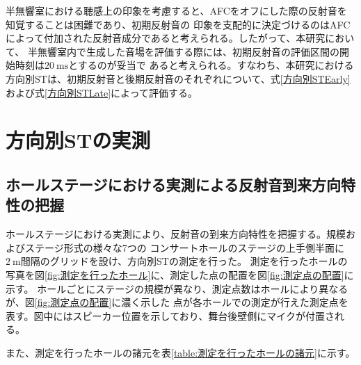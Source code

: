 \documentclass[11pt,a4j]{jreport}
\begin{document}
    半無響室における聴感上の印象を考慮すると、AFCをオフにした際の反射音を知覚することは困難であり、初期反射音の
    印象を支配的に決定づけるのはAFCによって付加された反射音成分であると考えられる。したがって、本研究において、
    半無響室内で生成した音場を評価する際には、初期反射音の評価区間の開始時刻は$\SI{20}{\ms}$とするのが妥当で
    あると考えられる。すなわち、本研究における方向別STは、初期反射音と後期反射音のそれぞれについて、式\ref{方向別STEarly}
    および式\ref{方向別STLate}によって評価する。

    \clearpage

  \section{方向別STの実測}

    \subsection{ホールステージにおける実測による反射音到来方向特性の把握}
    ホールステージにおける実測により、反射音の到来方向特性を把握する。規模およびステージ形式の様々な7つの
    コンサートホールのステージの上手側半面に$\SI{2}{\m}$間隔のグリッドを設け、方向別STの測定を行った。
    測定を行ったホールの写真を図\ref{fig:測定を行ったホール}に、測定した点の配置を図\ref{fig:測定点の配置}に示す。
    ホールごとにステージの規模が異なり、測定点数はホールにより異なるが、図\ref{fig:測定点の配置}に濃く示した
    点が各ホールでの測定が行えた測定点を表す。図中にはスピーカー位置を示しており、舞台後壁側にマイクが付置される。

    また、測定を行ったホールの諸元を表\ref{table:測定を行ったホールの諸元}に示す。
\end{document}
